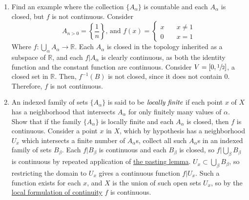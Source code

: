\documentclass[12pt,letterpaper]{article}
\begin{document}
\begin{enumerate}
\begin{enumerate}
    \item Find an example where the collection $\{A_\alpha\}$ is countable and each $A_\alpha$ is closed, but $f$ is not continuous.\hspace{5in}\n
    \indent Consider 
    $$A_{n>0}=\left\{\frac{1}{n}\right\}\text{, and } f(x)=\begin{cases} x & \quad x\neq 1 \\ 0 & \quad x=1\end{cases}$$
    Where $f: \bigcup_\alpha A_\alpha \rightarrow \mathbb{R}$. Each $A_\alpha$ is closed in the topology inherited as a subspace of $\mathbb{R}$, and each $f|A_\alpha$ is clearly continuous, as both the identity function and the constant function are continuous. Consider $V=[0,\sfrac{1}{2}]$, a closed set in $\mathbb{R}$. Then, $f^{-1}(B)$ is not closed, since it does not contain $0$. Therefore, $f$ is not continuous.
    \item An indexed family of sets $\{A_\alpha\}$ is said to be $\emph{locally finite}$ if each point $x$ of $X$ has a neighborhood that intersects $A_\alpha$ for only finitely many values of $\alpha$. Show that if the family $\{A_\alpha\}$ is locally finite and each $A_\alpha$ is closed, then $f$ is continuous.\hspace{5in}\n
    \indent Consider a point $x$ in $X$, which by hypothesis has a neighborhood $U_x$ which intersects a finite number of $A_\alpha$s, collect all such $A_\alpha$s in an indexed family of sets $B_\beta$. Each $f|B_\beta$ is continuous and each $B_\beta$ is closed, so $f|\bigcup_\beta B_\beta$ is continuous by repeated application of \hyperref[thm:PastingLemma]{the pasting lemma}. $U_x \subset \bigcup_\beta B_\beta$, so restricting the domain to $U_x$ gives a continuous function $f|U_x$. Such a function exists for each $x$, and $X$ is the union of such open sets $U_x$, so by the \hyperref[thm:LocalFormulationContinuity]{local formulation of continuity} $f$ is continuous.

\end{enumerate}
\end{enumerate}
\end{document}
